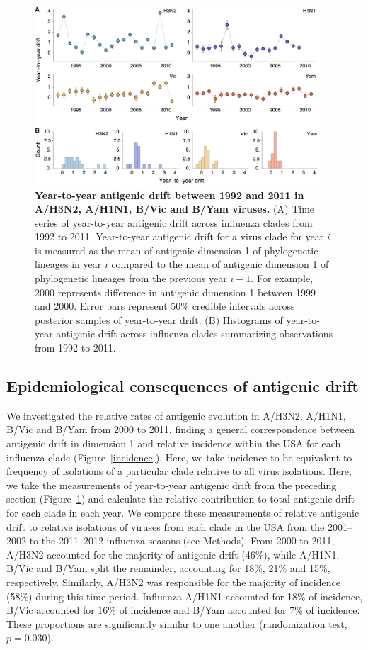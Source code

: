 \documentclass[11pt,oneside,letterpaper]{article}
\begin{document}
\begin{figure}[h]
	\centering		
	\includegraphics[width=0.95\textwidth]{figures/jumps}
	\caption{\textbf{Year-to-year antigenic drift between 1992 and 2011 in A/H3N2, A/H1N1, B/Vic and B/Yam viruses.} 
	(A) Time series of year-to-year antigenic drift across influenza clades from 1992 to 2011.
	Year-to-year antigenic drift for a virus clade for year $i$ is measured as the mean of antigenic dimension 1 of phylogenetic lineages in year $i$ compared to the mean of antigenic dimension 1 of phylogenetic lineages from the previous year $i-1$.
	For example, 2000 represents difference in antigenic dimension 1 between 1999 and 2000.
	Error bars represent 50\% credible intervals across posterior samples of year-to-year drift.
	(B) Histograms of year-to-year antigenic drift across influenza clades summarizing observations from 1992 to 2011.
	} 
	\label{jumps} 
\end{figure}

\subsection*{Epidemiological consequences of antigenic drift}

We investigated the relative rates of antigenic evolution in A/H3N2, A/H1N1, B/Vic and B/Yam from 2000 to 2011, finding a general correspondence between antigenic drift in dimension 1 and relative incidence within the USA for each influenza clade (Figure~\ref{incidence}).
Here, we take incidence to be equivalent to frequency of isolations of a particular clade relative to all virus isolations. 
Here, we take the measurements of year-to-year antigenic drift from the preceding section (Figure~\ref{jumps}) and calculate the relative contribution to total antigenic drift for each clade in each year.
We compare these measurements of relative antigenic drift to relative isolations of viruses from each clade in the USA from the 2001--2002 to the 2011--2012 influenza seasons (see Methods).
From 2000 to 2011, A/H3N2 accounted for the majority of antigenic drift (46\%), while A/H1N1, B/Vic and B/Yam split the remainder, accounting for 18\%, 21\% and 15\%, respectively.
Similarly, A/H3N2 was responsible for the majority of incidence (58\%) during this time period.
Influenza A/H1N1 accounted for 18\% of incidence, B/Vic accounted for 16\% of incidence and B/Yam accounted for 7\% of incidence.
These proportions are significantly similar to one another (randomization test, $p = 0.030$).
\end{document}
